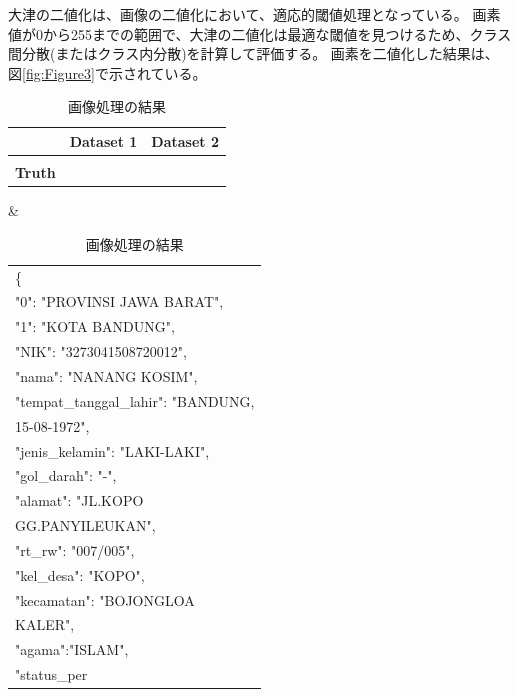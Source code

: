 \documentclass[uplatex, twocolumn,10pt]{jsarticle}
\begin{document}
大津の二値化は、画像の二値化において、適応的閾値処理となっている。
画素値が0から255までの範囲で、大津の二値化は最適な閾値を見つけるため、クラス間分散(またはクラス内分散)を計算して評価する。
画素を二値化した結果は、図\ref{fig:Figure3}で示されている。


\begin{table}[hbtp]
    \caption{画像処理の結果}
    \label{tb:Table1}
    \centering
    \begin{tabular}{|l|l|l|}
        \hline
                                       & \multicolumn{1}{c|}{\textbf{Dataset 1}} & \multicolumn{1}{c|}{\textbf{Dataset 2}} \\ 
        \hline
        \begin{tabular}[c]{@{}l@{}}\textbf{Ground}\\\textbf{Truth}\end{tabular}  & \begin{tabular}[l]{p{6cm}}\{\\"0": "PROVINSI JAWA BARAT", \\"1": "KOTA BANDUNG",\\"NIK": "3273041508720012", \\"nama": "NANANG KOSIM", \\"tempat\_tanggal\_lahir": "BANDUNG,\\15-08-1972",\\"jenis\_kelamin": "LAKI-LAKI",\\"gol\_darah": "-", \\"alamat": "JL.KOPO\\GG.PANYILEUKAN",\\"rt\_rw": "007/005",\\"kel\_desa": "KOPO", \\"kecamatan": "BOJONGLOA\\KALER",\\"agama":"ISLAM",\\"status\_per
\end{tabular}
\end{table}
\end{document}
